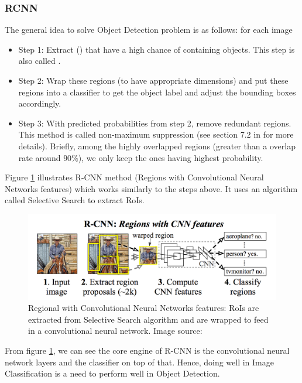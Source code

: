 \subsubsection{RCNN}
The general idea to solve Object Detection problem is as follows: for each image
\begin{itemize}
	\item Step 1: Extract  () that have a high chance of containing objects. This step is also called .
	\item Step 2: Wrap these regions (to have appropriate dimensions) and put these regions into a classifier to get the object label and adjust the bounding boxes accordingly.
	\item Step 3: With predicted probabilities from step 2, remove redundant regions. This method is called non-maximum suppression (see section 7.2 in \cite{Felzenszwalb:2010:ODD:1850486.1850574} for more details). Briefly, among the highly overlapped regions (greater than a overlap rate around $90\%$), we only keep the ones having highest probability.
\end{itemize}

Figure \ref{fig:rcnn} illustrates R-CNN method (Regions with Convolutional Neural Networks features) \cite{DBLP:journals/corr/GirshickDDM13} which works similarly to the steps above. It uses an algorithm called Selective Search \cite{Uijlings:2013:SSO:2509349.2509382} to extract RoIs.
\begin{figure}[tb]
	\centering
	\includegraphics[width=1.0\hsize]{./figures/rcnn}
	\caption{Regional with Convolutional Neural Networks features: RoIs are extracted from Selective Search algorithm \cite{Uijlings:2013:SSO:2509349.2509382} and are wrapped to feed in a convolutional neural network. Image source: \cite{DBLP:journals/corr/GirshickDDM13}}
	\label{fig:rcnn}
\end{figure}
From figure \ref{fig:rcnn}, we can see the core engine of R-CNN is the convolutional neural network layers and the classifier on top of that. Hence, doing well in Image Classification is a need to perform well in Object Detection.

